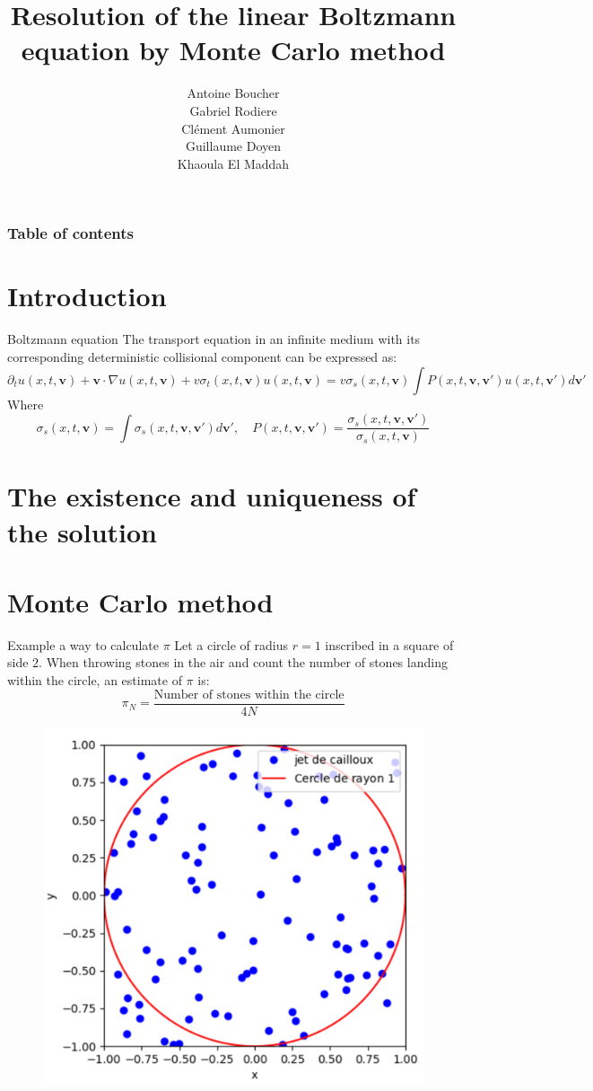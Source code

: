 \documentclass{beamer}
\title{ Resolution of the linear Boltzmann equation by Monte Carlo method}
\subtitle{}
\author{Antoine Boucher\\
	Gabriel Rodiere\\
	Clément Aumonier\\
	Guillaume Doyen\\
	Khaoula El Maddah}
\institute{}
\date{}
\begin{document}
	
	\begin{frame}
		\titlepage
	\end{frame}
	
	\begin{frame}
		\frametitle{Table of contents}
		\tableofcontents
	\end{frame}
	
	\section{Introduction}
	\begin{frame}{Boltzmann equation}
		The transport equation in an infinite medium with its corresponding deterministic collisional component can be expressed as:
		\begin{equation*}
			\partial _t u(x,t,\textbf{v}) + \textbf{v} \cdot \nabla u(x,t,\textbf{v}) + v\sigma_t (x,t,\textbf{v})u(x,t,\textbf{v})= v\sigma_s(x,t,\textbf{v})\int P (x,t,\textbf{v},\textbf{v}')u(x,t,\textbf{v}')d\textbf{v}' \label{ref11}
		\end{equation*}
		Where 
		\begin{equation*}
			\sigma_s (x,t,\textbf{v})= \int \sigma_s (x,t,\textbf{v},\textbf{v}')d\textbf{v}', \quad  P (x,t,\textbf{v},\textbf{v}')=
			\frac{\sigma_s (x,t,\textbf{v},\textbf{v}')}{\sigma_s (x,t,\textbf{v})}
		\end{equation*}
		
	\end{frame}
	\section{The existence and uniqueness of the solution}
	\section{Monte Carlo method}
	\begin{frame}{Example a way to calculate $\pi$}
		Let a circle of radius $r = 1$ inscribed in a square of side $2$. When throwing stones in the air and count the number of stones landing within the circle, an estimate of $\pi$ is: 
		\begin{equation*}
			\pi_N =\frac{\text{Number of stones within the circle}}{4 N}
		\end{equation*}
		\begin{figure}[h]
			\centering
			\includegraphics[width=0.5\linewidth]{pi.png}
			\label{fig:votre_label}
		\end{figure}
	\end{frame}
\end{document}
